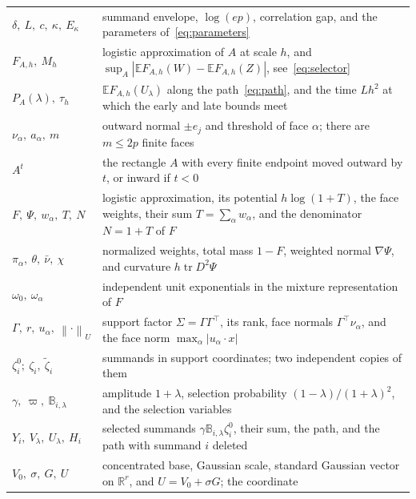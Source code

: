 \documentclass[11pt,letterpaper]{article}
\newif\ifshowrev
\newenvironment{revblock}{\ifshowrev\color{revblue}%
\hypersetup{linkcolor=revblue,citecolor=revblue,urlcolor=revblue}\fi}{}
\newif\ifshowtrim
\newcommand{\trim}[1]{\ifshowtrim{\color{revblue}%
\hypersetup{linkcolor=revblue,citecolor=revblue,urlcolor=revblue}#1}\else#1\fi}
\newcommand{\trs}[1]{\ifshowtrim{\color{revblue}#1}\else#1\fi}
\newif\ifshowskill
\newcommand{\skl}[1]{\ifshowskill{\color{revblue}%
\hypersetup{linkcolor=revblue,citecolor=revblue,urlcolor=revblue}#1}\else#1\fi}
\newcommand{\sks}[1]{\ifshowskill{\color{revblue}#1}\else#1\fi}
\theoremstyle{remark}
\newcommand{\E}{\mathbb E}
\newcommand{\R}{\mathbb R}
\newcommand{\tr}{\operatorname{tr}}
\newcommand{\norm}[1]{\left\lVert#1\right\rVert}
\begin{document}
\begin{revblock}
\medskip
\begin{center}
\small
\renewcommand{\arraystretch}{1.15}
\begin{tabular}{@{}p{}p{}@{}}
\trim{\(\delta,\ L,\ c,\ \kappa,\ E_\kappa\)} & \trim{summand envelope,
\(\log(ep)\), correlation gap, and the parameters
of~\eqref{eq:parameters}}\\
\trim{\(F_{A,h},\ M_h\)} & \trim{logistic approximation of \(A\) at scale
\(h\), and \(\sup_A|\E F_{A,h}(W)-\E F_{A,h}(Z)|\),
see~\eqref{eq:selector}}\\
\trim{\(P_A(\lambda),\ \tau_h\)} & \trim{\(\E F_{A,h}(U_\lambda)\) along
the path~\eqref{eq:path}, and the time \(Lh^2\) at which the early and
late bounds meet}\\
\(\nu_\alpha,\ a_\alpha,\ m\) & \trim{outward normal \(\pm e_j\)} and threshold of
face \(\alpha\); there are \(m\le2p\) finite faces\\
\(A^t\) & the rectangle \(A\) with every finite endpoint moved outward
by \(t\), or inward if \(t<0\)\\
\(F,\ \Psi,\ w_\alpha,\ T\trs{,\ N}\) & logistic approximation, its potential
\(h\log(1+T)\), the face weights, \trim{their} sum
\(T=\sum_\alpha w_\alpha\)\trim{, and the denominator \(N=1+T\) of \(F\)}\\
\(\pi_\alpha,\ \theta,\ \bar\nu,\ \chi\) & normalized weights, total
mass \(1-F\), weighted normal \(\nabla\Psi\), and curvature
\(h\tr D^2\Psi\)\\
\(\omega_0,\ \omega_\alpha\) & independent unit exponentials in the
mixture representation of \(F\)\\
\(\Gamma,\ r,\ u_\alpha,\ \norm\cdot_U\) & support factor
\(\Sigma=\Gamma\Gamma^\top\), its rank, face normals
\(\Gamma^\top\nu_\alpha\), and the face norm
\(\max_\alpha|u_\alpha\cdot x|\)\\
\(\zeta_i^0;\ \zeta_i,\ \widetilde\zeta_i\) & summands in support coordinates; two
independent copies of them\\
\(\gamma,\ \sks{\varpi},\ \sks{\mathbb B}_{i,\lambda}\) & amplitude \(1+\lambda\), selection
probability \((1-\lambda)/(1+\lambda)^2\), and the selection variables\\
\(Y_i,\ V_\lambda,\ U_\lambda,\ H_i\) & selected summands
\(\gamma \sks{\mathbb B}_{i,\lambda}\zeta_i^0\), their sum, the path, and the path with
summand \(i\) deleted\\
\(V_0,\ \sigma,\ G,\ U\) & concentrated base, Gaussian scale, standard
Gaussian vector on \(\R^r\), and \(U=V_0+\sigma G\)\skl{; the coordinate
}
\end{tabular}
\end{center}
\end{revblock}
\end{document}
